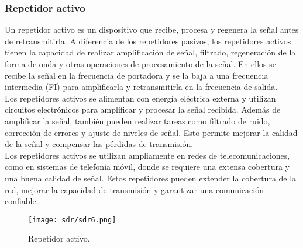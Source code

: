 \documentclass[
	12pt, %
	fleqn, %
	a4paper, %
	oneside, %
]{LegrandOrangeBook}
\begin{document}
\subsubsection{Repetidor activo}
Un repetidor activo es un dispositivo que recibe, procesa y regenera la señal antes de retransmitirla. A diferencia de los repetidores pasivos, los repetidores activos tienen la capacidad de realizar amplificación de señal, filtrado, regeneración de la forma de onda y otras operaciones de procesamiento de la señal. En ellos se recibe la señal en la frecuencia de portadora y se la baja a una frecuencia intermedia (FI) para amplificarla y retransmitirla en la frecuencia de salida.\\
Los repetidores activos se alimentan con energía eléctrica externa y utilizan circuitos electrónicos para amplificar y procesar la señal recibida. Además de amplificar la señal, también pueden realizar tareas como filtrado de ruido, corrección de errores y ajuste de niveles de señal. Esto permite mejorar la calidad de la señal y compensar las pérdidas de transmisión.\\
Los repetidores activos se utilizan ampliamente en redes de telecomunicaciones, como en sistemas de telefonía móvil, donde se requiere una extensa cobertura y una buena calidad de señal. Estos repetidores pueden extender la cobertura de la red, mejorar la capacidad de transmisión y garantizar una comunicación confiable.
\begin{figure}[H]
\centering
\texttt{[image: sdr/sdr6.png]}
\caption{Repetidor activo.}
\end{figure}
\end{document}
